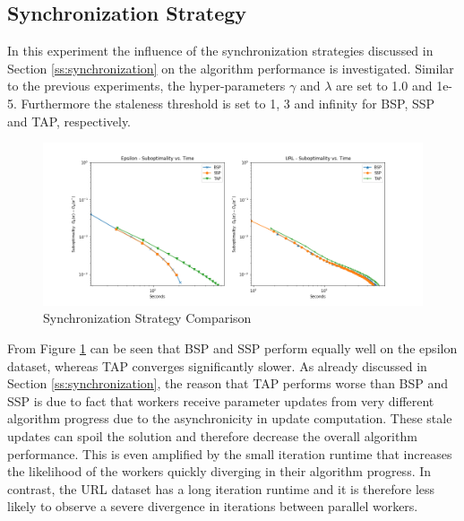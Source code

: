 \subsection{Synchronization Strategy}
In this experiment the influence of the synchronization strategies discussed in Section \ref{ss:synchronization} on the algorithm performance is investigated.
Similar to the previous experiments, the hyper-parameters $\gamma$ and $\lambda$ are set to 1.0 and 1e-5.
Furthermore the staleness threshold is set to 1, 3 and infinity for BSP, SSP and TAP, respectively.
\begin{figure}[ht]
\centering
\includegraphics[width=1.0\textwidth]{img/sync_strat_cmp.png}
\caption{Synchronization Strategy Comparison}
\label{fig:sync_strat_cmp}
\end{figure}
From Figure \ref{fig:sync_strat_cmp} can be seen that BSP and SSP perform equally well on the epsilon dataset, whereas TAP converges significantly slower.
As already discussed in Section \ref{ss:synchronization}, the reason that TAP performs worse than BSP and SSP is due to fact that workers receive parameter updates from very different algorithm progress due to the asynchronicity in update computation.
These stale updates can spoil the solution and therefore decrease the overall algorithm performance.
This is even amplified by the small iteration runtime that increases the likelihood of the workers quickly diverging in their algorithm progress.
In contrast, the URL dataset has a long iteration runtime and it is therefore less likely to observe a severe divergence in iterations between parallel workers.

